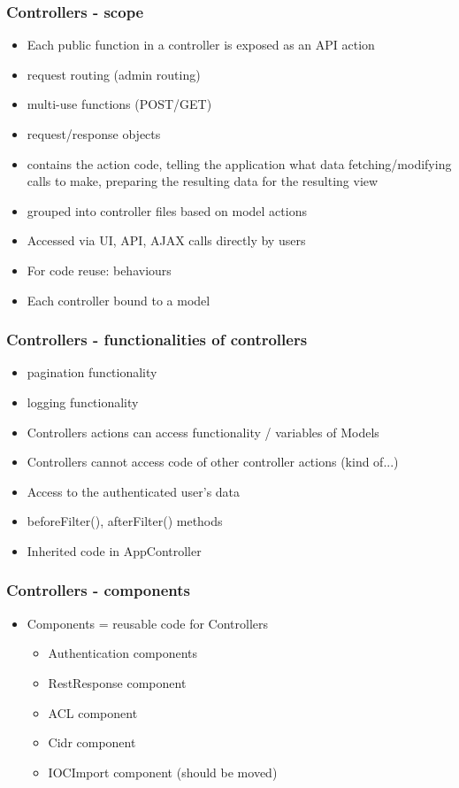 \begin{frame}
  \frametitle{Controllers - scope}
  \begin{itemize}
    \item Each public function in a controller is exposed as an API action
    \item request routing (admin routing)
    \item multi-use functions (POST/GET)
    \item request/response objects
    \item contains the action code, telling the application what data fetching/modifying calls to make, preparing the resulting data for the resulting view
    \item grouped into controller files based on model actions
    \item Accessed via UI, API, AJAX calls directly by users
    \item For code reuse: behaviours
    \item Each controller bound to a model
  \end{itemize}
\end{frame}

\begin{frame}
  \frametitle{Controllers - functionalities of controllers}
  \begin{itemize}
    \item pagination functionality
    \item logging functionality
    \item Controllers actions can access functionality / variables of Models
    \item Controllers cannot access code of other controller actions (kind of...)
    \item Access to the authenticated user's data
    \item beforeFilter(), afterFilter() methods
    \item Inherited code in AppController
  \end{itemize}
\end{frame}

\begin{frame}
  \frametitle{Controllers - components}
  \begin{itemize}
    \item Components = reusable code for Controllers
    \begin{itemize}
      \item Authentication components
      \item RestResponse component
      \item ACL component
      \item Cidr component
      \item IOCImport component (should be moved)
    \end{itemize}
  \end{itemize}
\end{frame}

